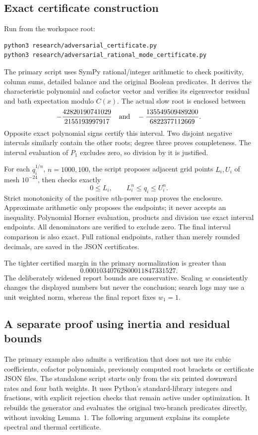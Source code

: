 \documentclass[11pt]{article}
\begin{document}
\subsection{Exact certificate construction}
Run from the workspace root:
\begin{verbatim}
python3 research/adversarial_certificate.py
python3 research/adversarial_rational_mode_certificate.py
\end{verbatim}
The primary script uses SymPy rational/integer arithmetic to check positivity, column sums, detailed balance and the original Boolean predicates. It derives the characteristic polynomial and cofactor vector and verifies its eigenvector residual and bath expectation modulo $C(x)$. The actual slow root is enclosed between
\[
-\frac{42820190741029}{2155193997917}
\quad\hbox{and}\quad
-\frac{135549509489200}{6822377112669}.
\]
Opposite exact polynomial signs certify this interval. Two disjoint negative intervals similarly contain the other roots; degree three proves completeness. The interval evaluation of $P_1$ excludes zero, so division by it is justified.

For each $q_i^{1/n}$, $n=1000,100$, the script proposes adjacent grid points $L_i,U_i$ of mesh $10^{-24}$, then checks exactly
\[
0\leq L_i,\qquad L_i^n\leq q_i\leq U_i^n.
\]
Strict monotonicity of the positive $n$th-power map proves the enclosure. Approximate arithmetic only proposes the endpoints; it never accepts an inequality. Polynomial Horner evaluation, products and division use exact interval endpoints. All denominators are verified to exclude zero. The final interval comparison is also exact. Full rational endpoints, rather than merely rounded decimals, are saved in the JSON certificates.

The tighter certified margin in the primary normalization is greater than
\[0.00010340762800011847331527.\]
The deliberately widened report bounds are conservative. Scaling $w$ consistently changes the displayed numbers but never the conclusion; search logs may use a unit weighted norm, whereas the final report fixes $w_1=1$.

\subsection{A separate proof using inertia and residual bounds}\label{sec:separatecheck}
The primary example also admits a verification that does not use its cubic coefficients, cofactor polynomials, previously computed root brackets or certificate JSON files. The standalone script  starts only from the six printed downward rates and four bath weights. It uses Python's standard-library integers and fractions, with explicit rejection checks that remain active under optimization. It rebuilds the generator and evaluates the original two-branch predicates directly, without invoking Lemma~1. The following argument explains its complete spectral and thermal certificate.
\end{document}
